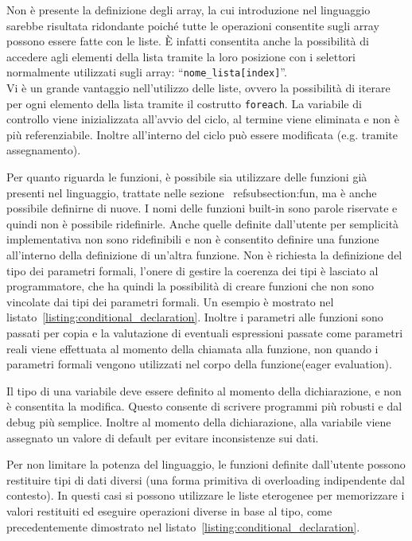\documentclass[10pt]{article}
\begin{document}
Non è presente la definizione degli array, la cui introduzione nel linguaggio sarebbe risultata ridondante poiché tutte le operazioni consentite sugli array possono essere fatte con le liste. È infatti consentita anche la possibilità di accedere agli elementi della lista tramite la loro posizione con i selettori normalmente utilizzati sugli array: ``\texttt{nome\_lista[index]}''.\\
Vi è un grande vantaggio nell'utilizzo delle liste, ovvero la possibilità di iterare per ogni elemento della lista tramite il costrutto \texttt{foreach}. La variabile di controllo viene inizializzata all'avvio del ciclo, al termine viene eliminata e non è più referenziabile. Inoltre all'interno del ciclo può essere modificata (e.g. tramite assegnamento).

Per quanto riguarda le funzioni, è possibile sia utilizzare delle funzioni già presenti nel linguaggio, trattate nelle sezione ~ref{subsection:fun}, ma è anche possibile definirne di nuove. I nomi delle funzioni built-in sono parole riservate e quindi non è possibile ridefinirle. Anche quelle definite dall'utente per semplicità implementativa non sono ridefinibili e non è consentito definire una funzione all'interno della definizione di un'altra funzione. Non è 
richiesta la definizione del tipo dei parametri formali, l'onere di gestire la coerenza dei tipi è lasciato al programmatore, che ha quindi la possibilità di creare funzioni che non sono vincolate dai tipi dei parametri formali. Un esempio è mostrato nel listato~\ref{listing:conditional_declaration}. Inoltre i parametri alle funzioni sono passati per copia e la valutazione di eventuali espressioni passate come parametri reali viene effettuata al momento della chiamata alla funzione, non quando i parametri formali vengono utilizzati nel corpo della funzione(eager evaluation).

Il tipo di una variabile deve essere definito al momento della dichiarazione, e non è consentita la modifica. Questo consente di scrivere programmi più robusti e dal debug più semplice. Inoltre al momento della dichiarazione, alla variabile viene assegnato un valore di default per evitare inconsistenze sui dati.

Per non limitare la potenza del linguaggio, le funzioni definite dall'utente possono restituire tipi di dati diversi (una forma primitiva di overloading indipendente dal contesto). In questi casi si possono utilizzare le liste eterogenee per memorizzare i valori restituiti ed eseguire operazioni diverse in base al tipo, come precedentemente dimostrato nel listato~\ref{listing:conditional_declaration}. 
\end{document}
